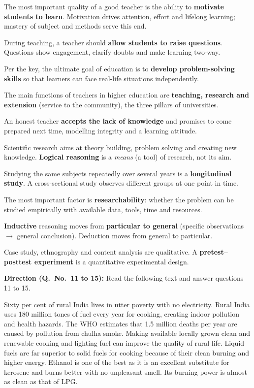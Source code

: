 The most important quality of a good teacher is the ability to \textbf{motivate students to learn}. Motivation drives attention, effort and lifelong learning; mastery of subject and methods serve this end.

During teaching, a teacher should \textbf{allow students to raise questions}. Questions show engagement, clarify doubts and make learning two-way.

Per the key, the ultimate goal of education is to \textbf{develop problem-solving skills} so that learners can face real-life situations independently.

The main functions of teachers in higher education are \textbf{teaching, research and extension} (service to the community), the three pillars of universities.

An honest teacher \textbf{accepts the lack of knowledge} and promises to come prepared next time, modelling integrity and a learning attitude.

Scientific research aims at theory building, problem solving and creating new knowledge. \textbf{Logical reasoning} is a \emph{means} (a tool) of research, not its aim.

Studying the same subjects repeatedly over several years is a \textbf{longitudinal study}. A cross-sectional study observes different groups at one point in time.

The most important factor is \textbf{researchability}: whether the problem can be studied empirically with available data, tools, time and resources.

\textbf{Inductive} reasoning moves from \textbf{particular to general} (specific observations $\rightarrow$ general conclusion). Deduction moves from general to particular.

Case study, ethnography and content analysis are qualitative. A \textbf{pretest--posttest experiment} is a quantitative experimental design.

\textbf{Direction (Q.~No.~11 to 15):} Read the following text and answer questions 11 to 15.\par\smallskip
Sixty per cent of rural India lives in utter poverty with no electricity. Rural India uses 180 million tones of fuel every year for cooking, creating indoor pollution and health hazards. The WHO estimates that 1.5 million deaths per year are caused by pollution from chulha smoke. Making available locally grown clean and renewable cooking and lighting fuel can improve the quality of rural life. Liquid fuels are far superior to solid fuels for cooking because of their clean burning and higher energy. Ethanol is one of the best as it is an excellent substitute for kerosene and burns better with no unpleasant smell. Its burning power is almost as clean as that of LPG.

